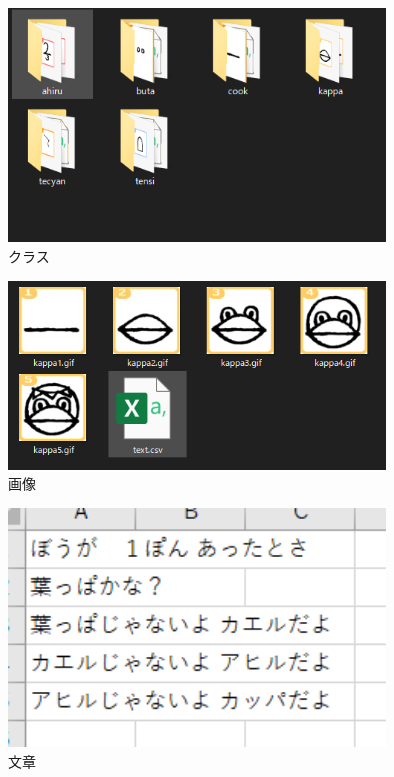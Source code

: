 \documentclass[onecolumn]{ujarticle}   %
\begin{document}
\begin{figure}[th]
  \begin{center}
    \includegraphics[clip,width=100mm]{ss1.png}
    \caption{クラス}
    \label{fig:r1}
  \end{center}
\end{figure}
\begin{figure}[th]
  \begin{center}
    \includegraphics[clip,width=100mm]{ss2.png}
    \caption{画像}
    \label{fig:r1}
  \end{center}
\end{figure}
\begin{figure}[th]
  \begin{center}
    \includegraphics[clip,width=100mm]{ss3.png}
    \caption{文章}
    \label{fig:r1}
  \end{center}
\end{figure}
\end{document}
